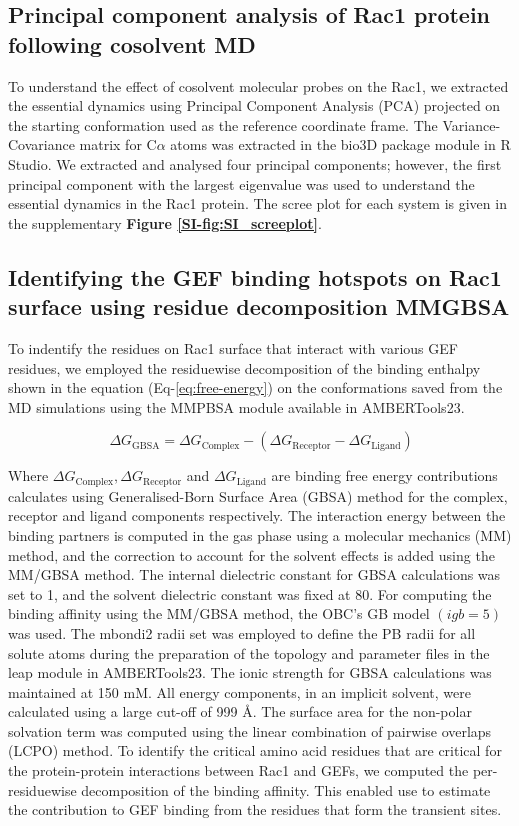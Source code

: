 \documentclass[12pt,a4paper]{achemso}
\begin{document}
\subsection{Principal component analysis of Rac1 protein following cosolvent MD}
To understand the effect of cosolvent molecular probes on the Rac1, we extracted the essential dynamics using Principal Component Analysis (PCA) projected on the starting conformation used as the reference coordinate frame. The Variance-Covariance matrix for C$\alpha$ atoms was extracted in the bio3D package\cite{bio3d} module in R Studio. We extracted and analysed four principal components; however, the first principal component with the largest eigenvalue was used to understand the essential dynamics in the Rac1 protein. The scree plot for each system is given in the supplementary \textbf{Figure \ref{SI-fig:SI_screeplot}}.

\subsection{Identifying the GEF binding hotspots on Rac1 surface using residue decomposition MMGBSA}

To indentify the residues on Rac1 surface that interact with various GEF residues, we employed the residuewise decomposition of the binding enthalpy shown in the equation (Eq-\ref{eq:free-energy}) on the conformations saved from the MD simulations using the MMPBSA module\cite{mmpbsa} available in AMBERTools23.

\begin{equation} \label{eq:free-energy}
     \   {\Delta}G_{\text{GBSA}} = {\Delta}G_{\text{Complex}} - ( {\Delta}G_{\text{Receptor}} - {\Delta}G_{\text{Ligand}})
\end{equation}

Where  ${\Delta}G_{\text{Complex}}, {\Delta}G_{\text{Receptor}}$ and $ {\Delta}G_{\text{Ligand}}$ are binding free energy contributions calculates using Generalised-Born Surface Area (GBSA) method for the complex, receptor and ligand components respectively. The interaction energy between the binding partners is computed in the gas phase using a molecular mechanics (MM) method, and the correction to account for the solvent effects is added using the MM/GBSA method. The internal dielectric constant for GBSA calculations was set to 1, and the solvent dielectric constant was fixed at 80. For computing the binding affinity using the MM/GBSA method, the OBC’s GB model\cite{igb5} $ (igb = 5) $ was used. The mbondi2 radii set was employed to define the PB radii for all solute atoms during the preparation of the topology and parameter files in the leap module in AMBERTools23. The ionic strength for GBSA calculations was maintained at 150 mM. All energy components, in an implicit solvent, were calculated using a large cut-off of 999 \r{A}. The surface area for the non-polar solvation term was computed using the linear combination of pairwise overlaps (LCPO) method\cite{lcpo}. To identify the critical amino acid residues that are critical for the protein-protein interactions between Rac1 and GEFs, we computed the per-residuewise decomposition of the binding affinity. This enabled use to estimate the contribution to GEF binding from the residues that form the transient sites.
\end{document}
